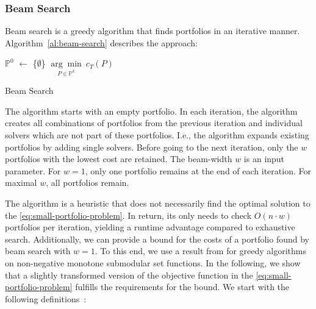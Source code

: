 \documentclass[conference]{IEEEtran}
\begin{document}
\subsubsection{Beam Search}

Beam search is a greedy algorithm that finds portfolios in an iterative manner.
Algorithm~\ref{al:beam-search} describes the approach:

\begin{algorithm}[htb]
	$\mathbb{P}^0$ $\leftarrow$ \{$\emptyset$\}
	\Return $\underset{P \in \mathbb{P}^k}{\arg\min}~c_{T}(P)$\;
	\caption{Beam Search}
	\label{al:beam-search}
\end{algorithm}

The algorithm starts with an empty portfolio.
In each iteration, the algorithm creates all combinations of portfolios from the previous iteration and individual solvers which are not part of these portfolios.
I.e., the algorithm expands existing portfolios by adding single solvers.
Before going to the next iteration, only the $w$ portfolios with the lowest cost are retained.
The beam-width $w$ is an input parameter.
For $w=1$, only one portfolio remains at the end of each iteration.
For maximal $w$, all portfolios remain.

The algorithm is a heuristic that does not necessarily find the optimal solution to the \ref{eq:small-portfolio-problem}.
In return, its only needs to check $O(n \cdot w)$ portfolios per iteration, yielding a runtime advantage compared to exhaustive search.
Additionally, we can provide a bound for the costs of a portfolio found by beam search with $w=1$.
To this end, we use a result from \cite{nemhauser1978analysis} for greedy algorithms on non-negative monotone submodular set functions.
In the following, we show that a slightly transformed version of the objective function in the \ref{eq:small-portfolio-problem} fulfills the requirements for the bound.
We start with the following definitions~\cite{krause2014submodular}:
\end{document}
